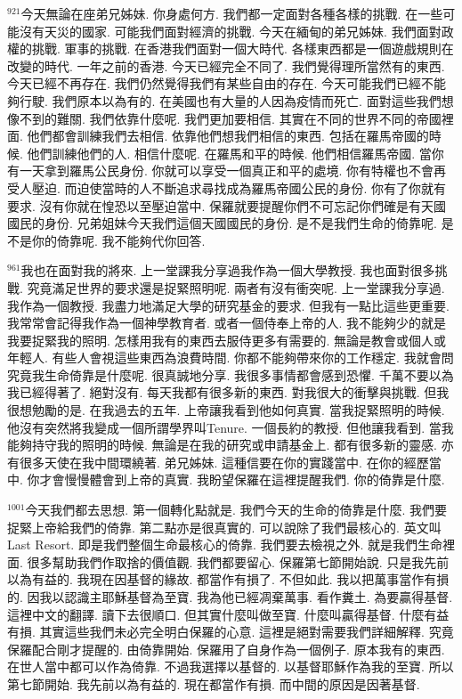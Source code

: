 \documentclass{book}
\begin{document}
$^{921}$今天無論在座弟兄姊妹.
你身處何方.
我們都一定面對各種各樣的挑戰.
在一些可能沒有天災的國家.
可能我們面對經濟的挑戰.
今天在緬甸的弟兄姊妹.
我們面對政權的挑戰.
軍事的挑戰.
在香港我們面對一個大時代.
各樣東西都是一個遊戲規則在改變的時代.
一年之前的香港.
今天已經完全不同了.
我們覺得理所當然有的東西.
今天已經不再存在.
我們仍然覺得我們有某些自由的存在.
今天可能我們已經不能夠行駛.
我們原本以為有的.
在美國也有大量的人因為疫情而死亡.
面對這些我們想像不到的難關.
我們依靠什麼呢.
我們更加要相信.
其實在不同的世界不同的帝國裡面.
他們都會訓練我們去相信.
依靠他們想我們相信的東西.
包括在羅馬帝國的時候.
他們訓練他們的人.
相信什麼呢.
在羅馬和平的時候.
他們相信羅馬帝國.
當你有一天拿到羅馬公民身份.
你就可以享受一個真正和平的處境.
你有特權也不會再受人壓迫.
而迫使當時的人不斷追求尋找成為羅馬帝國公民的身份.
你有了你就有要求.
沒有你就在惶恐以至壓迫當中.
保羅就要提醒你們不可忘記你們確是有天國國民的身份.
兄弟姐妹今天我們這個天國國民的身份.
是不是我們生命的倚靠呢.
是不是你的倚靠呢.
我不能夠代你回答.

$^{961}$我也在面對我的將來.
上一堂課我分享過我作為一個大學教授.
我也面對很多挑戰.
究竟滿足世界的要求還是捉緊照明呢.
兩者有沒有衝突呢.
上一堂課我分享過.
我作為一個教授.
我盡力地滿足大學的研究基金的要求.
但我有一點比這些更重要.
我常常會記得我作為一個神學教育者.
或者一個侍奉上帝的人.
我不能夠少的就是我要捉緊我的照明.
怎樣用我有的東西去服侍更多有需要的.
無論是教會或個人或年輕人.
有些人會視這些東西為浪費時間.
你都不能夠帶來你的工作穩定.
我就會問究竟我生命倚靠是什麼呢.
很真誠地分享.
我很多事情都會感到恐懼.
千萬不要以為我已經得著了.
絕對沒有.
每天我都有很多新的東西.
對我很大的衝擊與挑戰.
但我很想勉勵的是.
在我過去的五年.
上帝讓我看到他如何真實.
當我捉緊照明的時候.
他沒有突然將我變成一個所謂學界叫Tenure.
一個長約的教授.
但他讓我看到.
當我能夠持守我的照明的時候.
無論是在我的研究或申請基金上.
都有很多新的靈感.
亦有很多天使在我中間環繞著.
弟兄姊妹.
這種信要在你的實踐當中.
在你的經歷當中.
你才會慢慢體會到上帝的真實.
我盼望保羅在這裡提醒我們.
你的倚靠是什麼.

$^{1001}$今天我們都去思想.
第一個轉化點就是.
我們今天的生命的倚靠是什麼.
我們要捉緊上帝給我們的倚靠.
第二點亦是很真實的.
可以說除了我們最核心的.
英文叫Last Resort.
即是我們整個生命最核心的倚靠.
我們要去檢視之外.
就是我們生命裡面.
很多幫助我們作取捨的價值觀.
我們都要留心.
保羅第七節開始說.
只是我先前以為有益的.
我現在因基督的緣故.
都當作有損了.
不但如此.
我以把萬事當作有損的.
因我以認識主耶穌基督為至寶.
我為他已經凋棄萬事.
看作糞土.
為要贏得基督.
這裡中文的翻譯.
讀下去很順口.
但其實什麼叫做至寶.
什麼叫贏得基督.
什麼有益有損.
其實這些我們未必完全明白保羅的心意.
這裡是絕對需要我們詳細解釋.
究竟保羅配合剛才提醒的.
由倚靠開始.
保羅用了自身作為一個例子.
原本我有的東西.
在世人當中都可以作為倚靠.
不過我選擇以基督的.
以基督耶穌作為我的至寶.
所以第七節開始.
我先前以為有益的.
現在都當作有損.
而中間的原因是因著基督.
\end{document}
